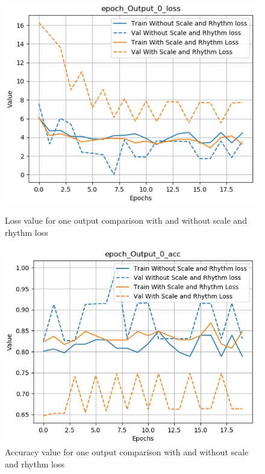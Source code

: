 \documentclass[12pt]{report}
\begin{document}
\begin{figure}[htbp]
    \begin{minipage}{0.5\textwidth}
        \begin{center}
            \includegraphics[width=\textwidth]{images/experiences/scale-rhythm-rnn/loss-output-comparison-scale-rhythm.jpg}
            \caption{Loss value for one output comparison with and without scale and rhythm loss}
            \label{fig:exp:scale-rhythm:loss-output-comparison}
        \end{center}
    \end{minipage} \hfill
    \begin{minipage}{0.5 \textwidth}
        \begin{center}
            \includegraphics[width=\textwidth]{images/experiences/scale-rhythm-rnn/acc-output-comparison-scale-rhythm.jpg}
            \caption{Accuracy value for one output comparison with and without scale and rhythm loss}
            \label{fig:exp:scale-rhythm:acc-output-comparison}
        \end{center}
    \end{minipage}
\end{figure}
\end{document}
